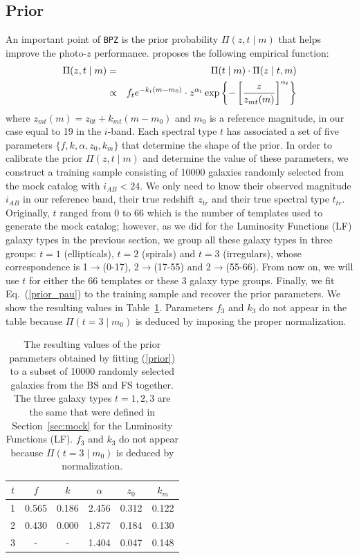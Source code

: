 \subsection{Prior}
An important point of \texttt{BPZ} is the prior probability $\Pi(z, t \mid m)$ that helps improve the photo-$z$ performance. \citet{Benitez2000} proposes the following empirical function:
\begin{eqnarray}
\Pi(z, t \mid m) &=& \Pi(t\mid m) \cdot \Pi(z \mid t, m) \nonumber \\
&\propto& f_t e^{-k_t(m-m_0)} \cdot z^{\alpha_t}\exp \left\lbrace -\left[ {z \over z_{mt}(m)} \right]^{\alpha_t} \right\rbrace \nonumber \\
\label{prior_pau}
\end{eqnarray}
where $z_{mt}(m) = z_{0t} + k_{mt}(m-m_0)$ and $m_0$ is a reference magnitude, in our case equal to 19 in the $i$-band. Each spectral type $t$ has associated a set of five parameters $\lbrace f,k,\alpha,z_0,k_{m} \rbrace$ that determine the shape of the prior. In order to calibrate the prior $\Pi(z,t\mid m)$ and determine the value of these parameters, we construct a training sample consisting of 10000 galaxies randomly selected from the mock catalog with $i_{AB}<24$. We only need to know their observed magnitude $i_{AB}$ in our reference band, their true redshift $z_{tr}$ and their true spectral type $t_{tr}$. Originally, $t$ ranged from 0 to 66 which is the number of templates used to generate the mock catalog; however, as we did for the Luminosity Functions (LF) galaxy types in the previous section, we group all these galaxy types in three groups: $t=1$ (ellipticals), $t=2$ (spirals) and $t=3$ (irregulars), whose correspondence is 1$\rightarrow$(0-17), 2$\rightarrow$(17-55) and 2$\rightarrow$(55-66). From now on, we will use $t$ for either the 66 templates or these 3 galaxy type groups. Finally, we fit Eq.~(\ref{prior_pau}) to the training sample and recover the prior parameters. We show the resulting values in Table~\ref{tab:prior_pau}. Parameters $f_3$ and $k_3$ do not appear in the table because $\Pi(t=3 \mid m_0)$ is deduced by imposing the proper normalization.
\begin{table}
\centering
\begin{tabular}{cccccc}
\hline
$t$ & $f$ & $k$ & $\alpha$ & $z_0$ & $k_{m}$ \\ \hline
1&0.565&0.186&2.456&0.312&0.122\\
2&0.430&0.000&1.877&0.184&0.130\\
3&-&-&1.404&0.047&0.148\\
\hline
\end{tabular}
\caption{The resulting values of the prior parameters obtained by fitting (\ref{prior}) to a subset of 10000 randomly selected galaxies from the BS and FS together. The three galaxy types $t=1,2,3$ are the same that were defined in Section~\ref{sec:mock} for the Luminosity Functions (LF). $f_3$ and $k_3$ do not appear because $\Pi(t=3 \mid m_0)$ is deduced by normalization.}
\label{tab:prior_pau}
\end{table}
